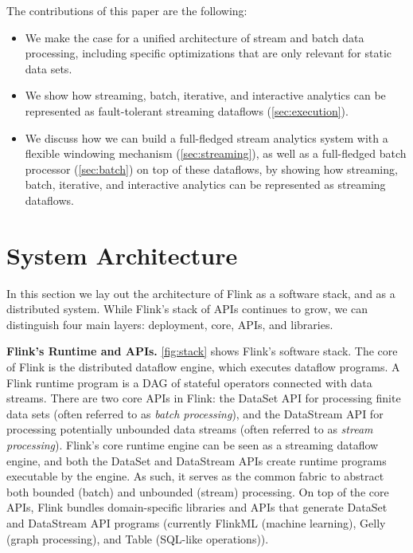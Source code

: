 \documentclass[11pt]{article}
\newcommand{\para}[1]{\vspace{2mm}\noindent\textbf{#1}}
\begin{document}
\vspace{2mm}
\noindent The contributions of this paper are the following:\vspace{-2mm}
\begin{itemize}
	\item We make the case for a unified architecture of stream and batch data processing, including specific optimizations that are only relevant for static data sets.
	\vspace{-3mm}
	\item We show how streaming, batch, iterative, and interactive analytics can be represented as fault-tolerant streaming dataflows (\autoref{sec:execution}).
	\vspace{-3mm}
	\item We discuss how we can build a full-fledged stream analytics system with a flexible windowing mechanism (\autoref{sec:streaming}), as well as a full-fledged batch processor (\autoref{sec:batch}) on top of these dataflows, by showing how streaming, batch, iterative, and interactive analytics can be represented as streaming dataflows.
\end{itemize}







\section{System Architecture}
\label{sec:architecture}

In this section we lay out the architecture of Flink as a software stack, and as a distributed system. While Flink's stack of APIs continues to grow, we can distinguish four main layers: deployment, core, APIs, and libraries.

\para{Flink's Runtime and APIs.}  \autoref{fig:stack} shows Flink's software stack. The core of Flink is the distributed dataflow engine, which executes dataflow programs. A Flink runtime program is a DAG of stateful operators connected with data streams. There are two core APIs in Flink: the DataSet API for processing finite data sets (often referred to as \emph{batch processing}), and the DataStream API for processing potentially unbounded data streams (often referred to as \emph{stream processing}). Flink's core runtime engine can be seen as a streaming dataflow engine, and both the DataSet and DataStream APIs create runtime programs executable by the engine. As such, it serves as the common fabric to abstract both bounded (batch) and unbounded (stream) processing. On top of the core APIs, Flink bundles domain-specific libraries and APIs that generate DataSet and DataStream API programs (currently FlinkML (machine learning), Gelly (graph processing), and Table (SQL-like operations)). 
\end{document}
